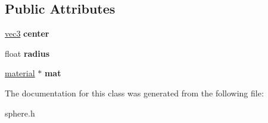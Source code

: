 \subsection*{Public Attributes}
\begin{DoxyCompactItemize}
\item 
\mbox{\label{classsphere_a627be5e72c760037f7e976a00e14192c}} 
\hyperlink{classvec3}{vec3} {\bfseries center}
\item 
\mbox{\label{classsphere_a9bad2d7ecf6f75cc998b893248fff8a2}} 
float {\bfseries radius}
\item 
\mbox{\label{classsphere_a206945004e5f943cdf78aa0f157c3c62}} 
\hyperlink{classmaterial}{material} $\ast$ {\bfseries mat}
\end{DoxyCompactItemize}


The documentation for this class was generated from the following file\+:\begin{DoxyCompactItemize}
\item 
sphere.\+h\end{DoxyCompactItemize}
